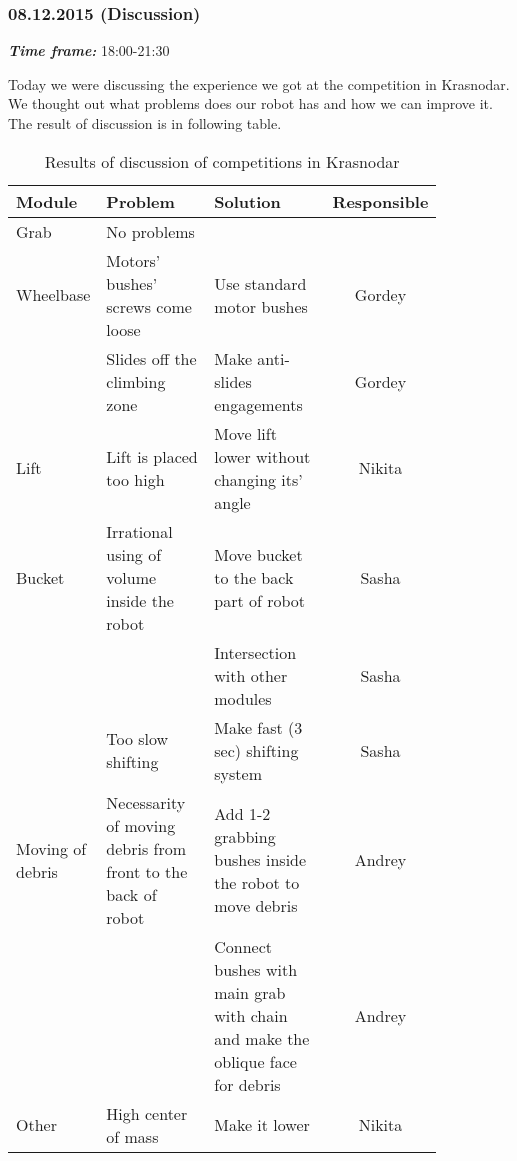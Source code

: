 \subsubsection{08.12.2015 (Discussion)}
\textit{\textbf{Time frame:}} 18:00-21:30

Today we were discussing the experience we got at the competition in Krasnodar. We thought out what problems does our robot has and how we can improve it. The result of discussion is in following table.

\begin{table}[H]
	\caption{Results of discussion of competitions in Krasnodar}
	\label{tabular:meetingKRA12.12}
	\begin{center}
		\begin{tabular}{|p{0.12\linewidth}|p{0.35\linewidth}|p{0.38\linewidth}|c|}
			\hline
			Module & Problem	& Solution	& Responsible \\
			\hline
			Grab	& No problems	& &	\\
			\hline
			Wheelbase &	Motors' bushes' screws come loose &	Use standard motor bushes &	Gordey \\
			& Slides off the climbing zone &	Make anti-slides engagements	& Gordey \\
			\hline
			Lift	& Lift is placed too high	& Move lift lower without changing its' angle	& Nikita \\
			\hline
			Bucket	& Irrational using of volume inside the robot &	Move bucket to the back part of robot	& Sasha\\
			& & Intersection with other modules		& Sasha \\
			& Too slow shifting	& Make fast (3 sec) shifting system	& Sasha \\
			\hline
			Moving of debris &	Necessarity of moving debris from front to the back of robot &	Add 1-2 grabbing bushes inside the robot to move debris	& Andrey \\
			& & Connect bushes with main grab with chain and make the oblique face for debris &	Andrey \\
			\hline
			Other	& High center of mass	& Make it lower & Nikita \\
			\hline
			
		\end{tabular}
	\end{center}
\end{table}
